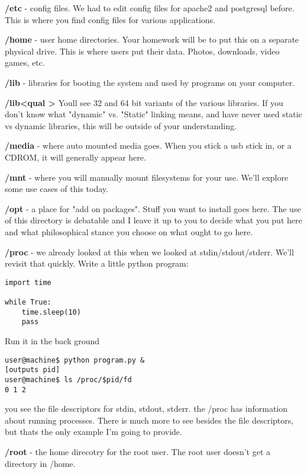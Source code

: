 \documentclass[10pt]{article}
\begin{document}
{\color{red} \textbf{/etc}} - config files. We had to edit config files for apache2 and postgresql before. This is where you find config files for various applications.

{\color{red} \textbf{/home}} - user home directories. Your homework will be to put this on a separate physical drive. This is where users put their data. Photos, downloads, video games, etc.

{\color{red} \textbf{/lib}} - libraries for booting the system and used by programs on your computer.

{\color{red} \textbf{/lib\textless qual \textgreater}} Youll see 32 and 64 bit variants of the various libraries. If you don't know what "dynamic" vs. "Static" linking means, and have never used static vs dynamic libraries, this will be outside of your understanding.

{\color{red} \textbf{/media}} - where auto mounted media goes. When you stick a usb stick in, or a CDROM, it will generally appear here.

{\color{red} \textbf{/mnt}} - where you will manually mount filesystems for your use. We'll explore some use cases of this today.

{\color{red} \textbf{/opt}} - a place for "add on packages". Stuff you want to install goes here. The use of this directory is debatable and I leave it up to you to decide what you put here and what philosophical stance you choose on what ought to go here.

{\color{red} \textbf{/proc}} - we already looked at this when we looked at stdin/stdout/stderr. We'll revisit that quickly. Write a little python program:

\begin{lstlisting}
import time

while True:
	time.sleep(10)
    pass
\end{lstlisting}

Run it in the back ground

\begin{lstlisting}
user@machine$ python program.py &
[outputs pid]
user@machine$ ls /proc/$pid/fd
0 1 2
\end{lstlisting}

you see the file descriptors for stdin, stdout, stderr. the /proc has information about running processes. There is much more to see besides the file descriptors, but thats the only example I'm going to provide.

{\color{red} \textbf{/root}} - the home direcotry for the root user. The root user doesn't get a directory in /home.
\end{document}
